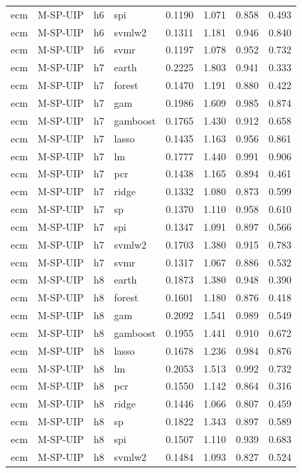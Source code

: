 \begin{ThreePartTable}
\begin{longtable}[t]{llclcccc}
ecm & M-SP-UIP & h6 & spi & 0.1190 & 1.071 & 0.858 & 0.493\\
ecm & M-SP-UIP & h6 & svmlw2 & 0.1311 & 1.181 & 0.946 & 0.840\\
ecm & M-SP-UIP & h6 & svmr & 0.1197 & 1.078 & 0.952 & 0.732\\
\addlinespace
ecm & M-SP-UIP & h7 & earth & 0.2225 & 1.803 & 0.941 & 0.333\\
ecm & M-SP-UIP & h7 & forest & 0.1470 & 1.191 & 0.880 & 0.422\\
ecm & M-SP-UIP & h7 & gam & 0.1986 & 1.609 & 0.985 & 0.874\\
ecm & M-SP-UIP & h7 & gamboost & 0.1765 & 1.430 & 0.912 & 0.658\\
ecm & M-SP-UIP & h7 & lasso & 0.1435 & 1.163 & 0.956 & 0.861\\
ecm & M-SP-UIP & h7 & lm & 0.1777 & 1.440 & 0.991 & 0.906\\
ecm & M-SP-UIP & h7 & pcr & 0.1438 & 1.165 & 0.894 & 0.461\\
ecm & M-SP-UIP & h7 & ridge & 0.1332 & 1.080 & 0.873 & 0.599\\
ecm & M-SP-UIP & h7 & sp & 0.1370 & 1.110 & 0.958 & 0.610\\
ecm & M-SP-UIP & h7 & spi & 0.1347 & 1.091 & 0.897 & 0.566\\
ecm & M-SP-UIP & h7 & svmlw2 & 0.1703 & 1.380 & 0.915 & 0.783\\
ecm & M-SP-UIP & h7 & svmr & 0.1317 & 1.067 & 0.886 & 0.532\\
\addlinespace
ecm & M-SP-UIP & h8 & earth & 0.1873 & 1.380 & 0.948 & 0.390\\
ecm & M-SP-UIP & h8 & forest & 0.1601 & 1.180 & 0.876 & 0.418\\
ecm & M-SP-UIP & h8 & gam & 0.2092 & 1.541 & 0.989 & 0.549\\
ecm & M-SP-UIP & h8 & gamboost & 0.1955 & 1.441 & 0.910 & 0.672\\
ecm & M-SP-UIP & h8 & lasso & 0.1678 & 1.236 & 0.984 & 0.876\\
ecm & M-SP-UIP & h8 & lm & 0.2053 & 1.513 & 0.992 & 0.732\\
ecm & M-SP-UIP & h8 & pcr & 0.1550 & 1.142 & 0.864 & 0.316\\
ecm & M-SP-UIP & h8 & ridge & 0.1446 & 1.066 & 0.807 & 0.459\\
ecm & M-SP-UIP & h8 & sp & 0.1822 & 1.343 & 0.897 & 0.589\\
ecm & M-SP-UIP & h8 & spi & 0.1507 & 1.110 & 0.939 & 0.683\\
ecm & M-SP-UIP & h8 & svmlw2 & 0.1484 & 1.093 & 0.827 & 0.524\\

\end{longtable}
\end{ThreePartTable}
